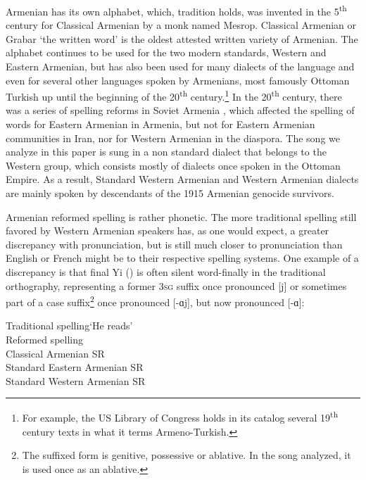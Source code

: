 \documentclass[output=paper,colorlinks,citecolor=brown]{langscibook}
\begin{document}
Armenian has its own alphabet, which, tradition holds, was invented in the 5\textsuperscript{th} century for Classical Armenian by a monk named Mesrop.  Classical Armenian or Grabar ‘the written word’ is the oldest attested written variety of Armenian.  The alphabet continues to be used for the two modern standards, Western and Eastern Armenian, but has also been used for many dialects of the language and even for several other languages spoken by Armenians, most famously Ottoman Turkish up until the beginning of the 20\textsuperscript{th} century.\footnote{For example, the US Library of Congress holds in its catalog several 19\textsuperscript{th} century texts in what it terms Armeno-Turkish.}  In the 20\textsuperscript{th} century, there was a series of spelling reforms in Soviet Armenia \citep{Dum2009}, which affected the spelling of words for Eastern Armenian in Armenia, but not for Eastern Armenian communities in Iran, nor for Western Armenian in the diaspora.  The song we analyze in this paper is sung in a non standard dialect that belongs to the Western group, which consists mostly of dialects once spoken in the Ottoman Empire.  As a result, Standard Western Armenian and Western Armenian dialects are mainly spoken by descendants of the 1915 Armenian genocide survivors.

Armenian reformed spelling is rather phonetic.  The more traditional spelling still favored by Western Armenian speakers has, as one would expect, a greater discrepancy with pronunciation, but is still much closer to pronunciation than English or French might be to their respective spelling systems.  One example of a discrepancy is that final Yi () is often silent word-finally in the traditional orthography, representing a former 3\textsc{sg} suffix once pronounced [j] or sometimes part of a case suffix\footnote{The suffixed form is genitive, possessive or ablative.  In the song analyzed, it is used once as an ablative.} once pronounced [-ɑj], but now pronounced [-ɑ]:

\begin{exe}
    \ex \label{baronian:ex2} Traditional spelling\tab \tab				{}\tab	`He reads’\\
Reformed spelling\tab	\tab			\armenian{Կարդա}\tab\\
Classical Armenian SR\tab 			[karday]\tab \\
Standard Eastern Armenian SR\tab		[kɑɾdɑ]\tab \\
Standard Western Armenian SR\tab 
\end{exe}
\end{document}
